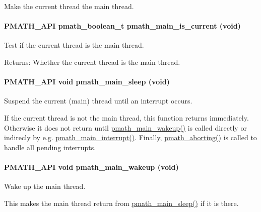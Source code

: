 Make the current thread the main thread. \hypertarget{group__mainthread_g92ca1b4bc94f99370d5397d6db61a729}{
\paragraph[{pmath\_\-main\_\-is\_\-current}]{\setlength{\rightskip}{0pt plus 5cm}PMATH\_\-API {\bf pmath\_\-boolean\_\-t} pmath\_\-main\_\-is\_\-current (void)}\hfill}
\label{group__mainthread_g92ca1b4bc94f99370d5397d6db61a729}


Test if the current thread is the main thread. 

\begin{Desc}
\item[Returns:]Whether the current thread is the main thread. \end{Desc}
\hypertarget{group__mainthread_gbf65d599bb8f32c96d0a0d6ff14bf858}{
\paragraph[{pmath\_\-main\_\-sleep}]{\setlength{\rightskip}{0pt plus 5cm}PMATH\_\-API void pmath\_\-main\_\-sleep (void)}\hfill}
\label{group__mainthread_gbf65d599bb8f32c96d0a0d6ff14bf858}


Suspend the current (main) thread until an interrupt occurs. 

If the current thread is not the main thread, this function returns immediately. Otherwise it does not return until \hyperlink{group__mainthread_g55431179eb0026a983b3177fba6870b6}{pmath\_\-main\_\-wakeup()} is called directly or indirecly by e.g. \hyperlink{group__mainthread_g3514921bc9c7fcf88513abe999689d8b}{pmath\_\-main\_\-interrupt()}. Finally, \hyperlink{group__threads_g7d0caef45c80f8cdf5bddb124614d13e}{pmath\_\-aborting()} is called to handle all pending interrupts. \hypertarget{group__mainthread_g55431179eb0026a983b3177fba6870b6}{
\paragraph[{pmath\_\-main\_\-wakeup}]{\setlength{\rightskip}{0pt plus 5cm}PMATH\_\-API void pmath\_\-main\_\-wakeup (void)}\hfill}
\label{group__mainthread_g55431179eb0026a983b3177fba6870b6}


Wake up the main thread. 

This makes the main thread return from \hyperlink{group__mainthread_gbf65d599bb8f32c96d0a0d6ff14bf858}{pmath\_\-main\_\-sleep()} if it is there. 